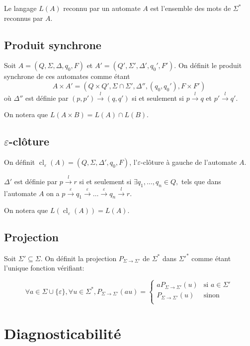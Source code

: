 \documentclass[10pt,a4paper]{article}
\begin{document}
Le langage $L(A)$ reconnu par un automate $A$ est l'ensemble des mots de $\Sigma^*$ reconnus par $A$.

\subsection{Produit synchrone}

Soit $A = (Q, \Sigma, \Delta, q_0, F)$ et $A' = (Q', \Sigma', \Delta', q_0', F')$. On définit le produit synchrone de ces automates comme \'etant $$A\times A' = (Q \times Q', \Sigma \cap \Sigma', \Delta'', (q_0, q_0'), F\times F')$$ o\`u $\Delta''$ est d\'efinie par $(p,p')\overset{l}{{\to}}(q,q')$ si et seulement si $p\overset{l}{{\to}}q$ et $p'\overset{l}{{\to}}q'$.

On notera que $L(A\times B) = L(A) \cap L(B)$.

\subsection{$\varepsilon$-clôture}

On définit  $\operatorname{cl}_\varepsilon(A) = (Q, \Sigma, \Delta', q_0, F)$, l'$\varepsilon$-clôture \`a gauche de l'automate $A$.

$\Delta'$ est d\'efinie par $p \overset{l}{{\to}} r$ si et seulement si $\exists q_1,\dots,q_n \in Q,$ tels que dans l'automate $A$ on a  $p \overset{\varepsilon}{{\to}} q_1 \overset{\varepsilon}{{\to}} \dots \overset{\varepsilon}{{\to}} q_n \overset{l}{{\to}} r$.

On notera que $L(\operatorname{cl}_\varepsilon(A))=L(A)$.

\subsection{Projection}

Soit $\Sigma'\subseteq \Sigma$. On d\'efinit la projection $P_{\Sigma \to \Sigma'}$ de $\Sigma^*$ dans $\Sigma'^*$ comme \'etant l'unique fonction v\'erifiant:

$$\forall a \in \Sigma \cup \{\varepsilon\}, \forall u \in \Sigma^*, P_{\Sigma \to \Sigma'}(au)=
\left\{\begin{array}{ll}
aP_{\Sigma \to \Sigma'}(u) &\text{si } a\in \Sigma'\\
P_{\Sigma \to \Sigma'}(u) &\text{sinon} \\
\end{array}\right.$$

\section{Diagnosticabilit\'e}
\end{document}
